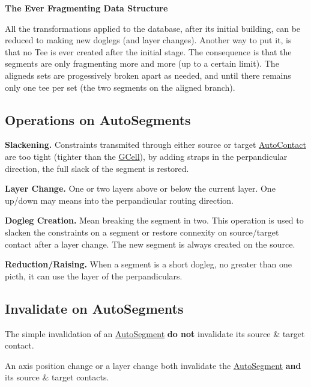 {\bfseries The Ever Fragmenting Data Structure}

All the transformations applied to the database, after it\textquotesingle{}s initial building, can be reduced to making new doglegs (and layer changes). Another way to put it, is that no Tee is ever created after the initial stage. The consequence is that the segments are only fragmenting more and more (up to a certain limit). The aligneds sets are progessively broken apart as needed, and until there remains only one tee per set (the two segments on the aligned branch).\hypertarget{classKatabatic_1_1AutoSegment_secASOperations}{}\subsection{Operations on Auto\+Segments}\label{classKatabatic_1_1AutoSegment_secASOperations}

\begin{DoxyItemize}
\item {\bfseries Slackening.} Constraints transmited through either source or target \mbox{\hyperlink{classKatabatic_1_1AutoContact}{Auto\+Contact}} are too tight (tighter than the \mbox{\hyperlink{classKatabatic_1_1GCell}{G\+Cell}}), by adding straps in the perpandicular direction, the full slack of the segment is restored. 
\item {\bfseries Layer Change.} One or two layers above or below the current layer. One up/down may means into the perpandicular routing direction. 
\item {\bfseries Dogleg Creation.} Mean breaking the segment in two. This operation is used to slacken the constraints on a segment or restore connexity on source/target contact after a layer change. The new segment is always created on the source. 
\item {\bfseries Reduction/\+Raising.} When a segment is a short dogleg, no greater than one picth, it can use the layer of the perpandiculars. 
\end{DoxyItemize}\hypertarget{classKatabatic_1_1AutoSegment_secASInvalidate}{}\subsection{Invalidate on Auto\+Segments}\label{classKatabatic_1_1AutoSegment_secASInvalidate}
The simple invalidation of an \mbox{\hyperlink{classKatabatic_1_1AutoSegment}{Auto\+Segment}} {\bfseries do not} invalidate it\textquotesingle{}s source \& target contact.

An axis position change or a layer change both invalidate the \mbox{\hyperlink{classKatabatic_1_1AutoSegment}{Auto\+Segment}} {\bfseries and} it\textquotesingle{}s source \& target contacts.

